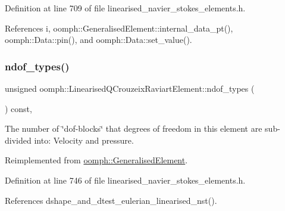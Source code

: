 Definition at line 709 of file linearised\+\_\+navier\+\_\+stokes\+\_\+elements.\+h.



References i, oomph\+::\+Generalised\+Element\+::internal\+\_\+data\+\_\+pt(), oomph\+::\+Data\+::pin(), and oomph\+::\+Data\+::set\+\_\+value().

\mbox{\label{classoomph_1_1LinearisedQCrouzeixRaviartElement_afae2721645a04e31cbd1eace58a1592d}} 
\subsubsection{\texorpdfstring{ndof\+\_\+types()}{ndof\_types()}}
{\footnotesize\ttfamily unsigned oomph\+::\+Linearised\+Q\+Crouzeix\+Raviart\+Element\+::ndof\+\_\+types (\begin{DoxyParamCaption}{ }\end{DoxyParamCaption}) const\hspace{0.3cm}{\ttfamily [inline]}, {\ttfamily [virtual]}}



The number of \char`\"{}dof-\/blocks\char`\"{} that degrees of freedom in this element are sub-\/divided into\+: Velocity and pressure. 



Reimplemented from \hyperlink{classoomph_1_1GeneralisedElement_a0c6037a870597b35dcf1c780710b9a56}{oomph\+::\+Generalised\+Element}.



Definition at line 746 of file linearised\+\_\+navier\+\_\+stokes\+\_\+elements.\+h.



References dshape\+\_\+and\+\_\+dtest\+\_\+eulerian\+\_\+linearised\+\_\+nst().

\mbox{\label{classoomph_1_1LinearisedQCrouzeixRaviartElement_abf9a73af7823990fc95fd6bea9ecaca4}} 
